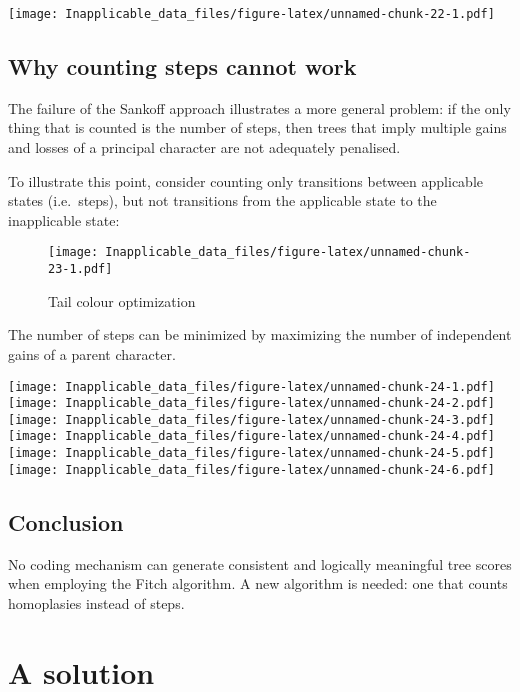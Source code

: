 \documentclass[]{book}
\theoremstyle{definition}
\theoremstyle{definition}
\theoremstyle{definition}
\theoremstyle{remark}
\begin{document}
\texttt{[image: Inapplicable\_data\_files/figure-latex/unnamed-chunk-22-1.pdf]}

\hypertarget{why-counting-steps-cannot-work}{%
\section{Why counting steps cannot
work}\label{why-counting-steps-cannot-work}}

The failure of the Sankoff approach illustrates a more general problem:
if the only thing that is counted is the number of steps, then trees
that imply multiple gains and losses of a principal character are not
adequately penalised.

To illustrate this point, consider counting only transitions between
applicable states (i.e.~steps), but not transitions from the applicable
state to the inapplicable state:

\begin{figure}
\centering
\texttt{[image: Inapplicable\_data\_files/figure-latex/unnamed-chunk-23-1.pdf]}
\caption{\label{fig:unnamed-chunk-23}Tail colour optimization}
\end{figure}

The number of steps can be minimized by maximizing the number of
independent gains of a parent character.

\texttt{[image: Inapplicable\_data\_files/figure-latex/unnamed-chunk-24-1.pdf]}
\texttt{[image: Inapplicable\_data\_files/figure-latex/unnamed-chunk-24-2.pdf]}
\texttt{[image: Inapplicable\_data\_files/figure-latex/unnamed-chunk-24-3.pdf]}
\texttt{[image: Inapplicable\_data\_files/figure-latex/unnamed-chunk-24-4.pdf]}
\texttt{[image: Inapplicable\_data\_files/figure-latex/unnamed-chunk-24-5.pdf]}
\texttt{[image: Inapplicable\_data\_files/figure-latex/unnamed-chunk-24-6.pdf]}

\hypertarget{conclusion}{%
\section{Conclusion}\label{conclusion}}

No coding mechanism can generate consistent and logically meaningful
tree scores when employing the Fitch algorithm. A new algorithm is
needed: one that counts homoplasies instead of steps.

\hypertarget{solution}{%
\chapter{A solution}\label{solution}}
\end{document}
